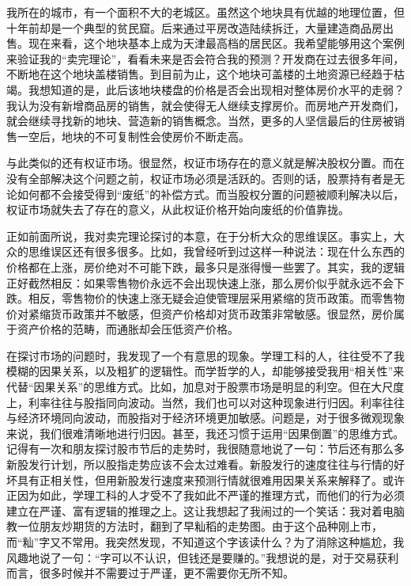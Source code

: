 我所在的城市，有一个面积不大的老城区。虽然这个地块具有优越的地理位置，但十年前却是一个典型的贫民窟。后来通过平房改造陆续拆迁，大量建造商品房出售。现在来看，这个地块基本上成为天津最高档的居民区。我希望能够用这个案例来验证我的“卖完理论”，看看未来是否会符合我的预测？开发商在过去很多年间，不断地在这个地块盖楼销售。到目前为止，这个地块可盖楼的土地资源已经趋于枯竭。我想知道的是，此后该地块楼盘的价格是否会出现相对整体房价水平的走弱？我认为没有新增商品房的销售，就会使得无人继续支撑房价。而房地产开发商们，就会继续寻找新的地块、营造新的销售概念。当然，更多的人坚信最后的住房被销售一空后，地块的不可复制性会使房价不断走高。

与此类似的还有权证市场。很显然，权证市场存在的意义就是解决股权分置。而在没有全部解决这个问题之前，权证市场必须是活跃的。否则的话，股票持有者是无论如何都不会接受得到“废纸”的补偿方式。而当股权分置的问题被顺利解决以后，权证市场就失去了存在的意义，从此权证价格开始向废纸的价值靠拢。

正如前面所说，我对卖完理论探讨的本意，在于分析大众的思维误区。事实上，大众的思维误区还有很多很多。比如，我曾经听到过这样一种说法：现在什么东西的价格都在上涨，房价绝对不可能下跌，最多只是涨得慢一些罢了。其实，我的逻辑正好截然相反：如果零售物价永远不会出现快速上涨，那么房价似乎就永远不会下跌。相反，零售物价的快速上涨无疑会迫使管理层采用紧缩的货币政策。而零售物价对紧缩货币政策并不敏感，但资产价格却对货币政策非常敏感。很显然，房价属于资产价格的范畴，而通胀却会压低资产价格。

在探讨市场的问题时，我发现了一个有意思的现象。学理工科的人，往往受不了我模糊的因果关系，以及粗犷的逻辑性。而学哲学的人，却能够接受我用“相关性”来代替“因果关系”的思维方式。比如，加息对于股票市场是明显的利空。但在大尺度上，利率往往与股指同向波动。当然，我们也可以对这种现象进行归因。利率往往与经济环境同向波动，而股指对于经济环境更加敏感。问题是，对于很多微观现象来说，我们很难清晰地进行归因。甚至，我还习惯于运用“因果倒置”的思维方式。记得有一次和朋友探讨股市节后的走势时，我很随意地说了一句：节后还有那么多新股发行计划，所以股指走势应该不会太过难看。新股发行的速度往往与行情的好坏具有正相关性，但用新股发行速度来预测行情就很难用因果关系来解释了。或许正因为如此，学理工科的人才受不了我如此不严谨的推理方式，而他们的行为必须建立在严谨、富有逻辑的推理之上。这让我想起了我闹过的一个笑话：我对着电脑教一位朋友炒期货的方法时，翻到了早籼稻的走势图。由于这个品种刚上市，而“籼”字又不常用。我突然发现，不知道这个字该读什么？为了消除这种尴尬，我风趣地说了一句：“字可以不认识，但钱还是要赚的。”我想说的是，对于交易获利而言，很多时候并不需要过于严谨，更不需要你无所不知。

